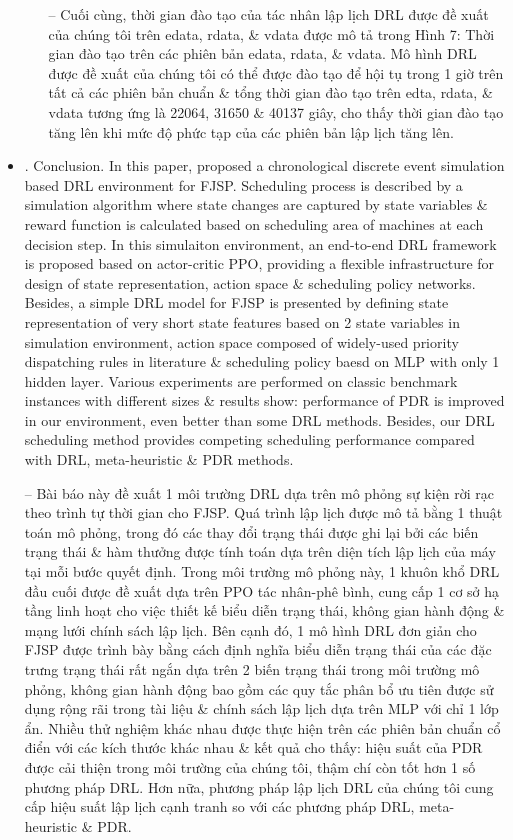 \documentclass{article}
\begin{document}
\begin{itemize}
\begin{itemize}
        -- Cuối cùng, thời gian đào tạo của tác nhân lập lịch DRL được đề xuất của chúng tôi trên edata, rdata, \& vdata được mô tả trong {\sf Hình 7: Thời gian đào tạo trên các phiên bản edata, rdata, \& vdata.} Mô hình DRL được đề xuất của chúng tôi có thể được đào tạo để hội tụ trong 1 giờ trên tất cả các phiên bản chuẩn \& tổng thời gian đào tạo trên edta, rdata, \& vdata tương ứng là 22064, 31650 \& 40137 giây, cho thấy thời gian đào tạo tăng lên khi mức độ phức tạp của các phiên bản lập lịch tăng lên.
    \end{itemize}
    \item {. Conclusion.} In this paper, proposed a chronological discrete event simulation based DRL environment for FJSP. Scheduling process is described by a simulation algorithm where state changes are captured by state variables \& reward function is calculated based on scheduling area of machines at each decision step. In this simulaiton environment, an end-to-end DRL framework is proposed based on actor-critic PPO, providing a flexible infrastructure for design of state representation, action space \& scheduling policy networks. Besides, a simple DRL model for FJSP is presented by defining state representation of very short state features based on 2 state variables in simulation environment, action space composed of widely-used priority dispatching rules in literature \& scheduling policy baesd on MLP with only 1 hidden layer. Various experiments are performed on classic benchmark instances with different sizes \& results show: performance of PDR is improved in our environment, even better than some DRL methods. Besides, our DRL scheduling method provides competing scheduling performance compared with DRL, meta-heuristic \& PDR methods.

    -- Bài báo này đề xuất 1 môi trường DRL dựa trên mô phỏng sự kiện rời rạc theo trình tự thời gian cho FJSP. Quá trình lập lịch được mô tả bằng 1 thuật toán mô phỏng, trong đó các thay đổi trạng thái được ghi lại bởi các biến trạng thái \& hàm thưởng được tính toán dựa trên diện tích lập lịch của máy tại mỗi bước quyết định. Trong môi trường mô phỏng này, 1 khuôn khổ DRL đầu cuối được đề xuất dựa trên PPO tác nhân-phê bình, cung cấp 1 cơ sở hạ tầng linh hoạt cho việc thiết kế biểu diễn trạng thái, không gian hành động \& mạng lưới chính sách lập lịch. Bên cạnh đó, 1 mô hình DRL đơn giản cho FJSP được trình bày bằng cách định nghĩa biểu diễn trạng thái của các đặc trưng trạng thái rất ngắn dựa trên 2 biến trạng thái trong môi trường mô phỏng, không gian hành động bao gồm các quy tắc phân bổ ưu tiên được sử dụng rộng rãi trong tài liệu \& chính sách lập lịch dựa trên MLP với chỉ 1 lớp ẩn. Nhiều thử nghiệm khác nhau được thực hiện trên các phiên bản chuẩn cổ điển với các kích thước khác nhau \& kết quả cho thấy: hiệu suất của PDR được cải thiện trong môi trường của chúng tôi, thậm chí còn tốt hơn 1 số phương pháp DRL. Hơn nữa, phương pháp lập lịch DRL của chúng tôi cung cấp hiệu suất lập lịch cạnh tranh so với các phương pháp DRL, meta-heuristic \& PDR.


\end{itemize}
\end{document}
